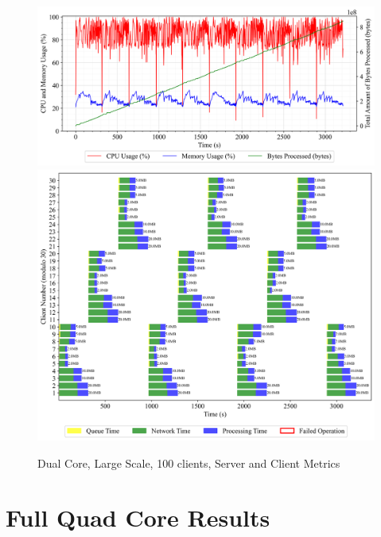 \newpage
\begin{figure}[h!t]
    \begin{center}
    \label{Fig:A1.8}
    \caption{Dual Core, Large Scale, 100 clients, Server and Client Metrics}
    \includegraphics[width=\xLarge\textwidth]{Chapter4/Results/2c_results/arty-a7-2c_large_scale_1000_20241003_153405.db_server_metrics.png}
    \includegraphics[width=\xLarge\textwidth]{Chapter4/Results/2c_results/arty-a7-2c_large_scale_1000_20241003_153405.db_client_tasks.png}
    \end{center}
\end{figure}

\newpage
\section{Full Quad Core Results}

